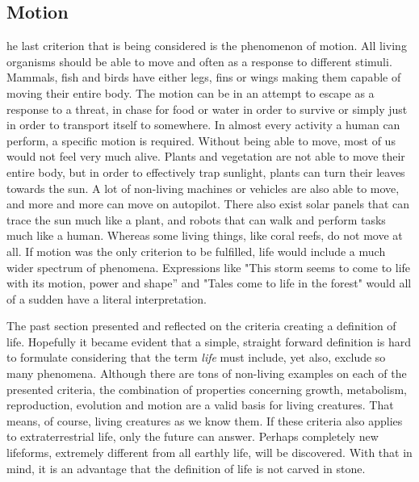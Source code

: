 \subsection*{Motion}
he last criterion that is being considered is the phenomenon of motion.
All living organisms should be able to move and often as a response to different stimuli.
Mammals, fish and birds have either legs, fins or wings making them capable of moving their entire body.
The motion can be in an attempt to escape as a response to a threat, in chase for food or water in order to survive or simply just in order to transport itself to somewhere.
In almost every activity a human can perform, a specific motion is required.
Without being able to move, most of us would not feel very much alive.
Plants and vegetation are not able to move their entire body, but in order to effectively trap sunlight, plants can turn their leaves towards the sun.
A lot of non-living machines or vehicles are also able to move, and more and more can move on autopilot.
There also exist solar panels that can trace the sun much like a plant, and robots that can walk and perform tasks much like a human.
Whereas some living things, like coral reefs, do not move at all.
If motion was the only criterion to be fulfilled, life would include a much wider spectrum of phenomena.
Expressions like "This storm seems to come to life with its motion, power and shape'' and "Tales come to life in the forest" would all of a sudden have a literal interpretation. 

The past section presented and reflected on the criteria creating a definition of life.
Hopefully it became evident that a simple, straight forward definition is hard to formulate considering that the term \textit{life} must include, yet also, exclude so many phenomena.
Although there are tons of non-living examples on each of the presented criteria, the combination of properties concerning growth, metabolism, reproduction, evolution and motion are a valid basis for living creatures.
That means, of course, living creatures as we know them.
If these criteria also applies to extraterrestrial life, only the future can answer.
Perhaps completely new lifeforms, extremely different from all earthly life, will be discovered.
With that in mind, it is an advantage that the definition of life is not carved in stone.
